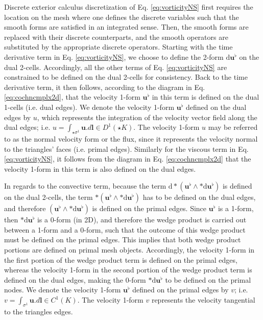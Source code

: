 \documentclass[final,12pt,times]{elsarticle}
\begin{document}
Discrete exterior calculus discretization of Eq. \eqref{eq:vorticityNS} first requires the location on the mesh where one defines the discrete variables such that the smooth forms are satisfied in an integrated sense. Then, the smooth forms are replaced with their discrete counterparts, and the smooth operators are substituted by the appropriate discrete operators. Starting with the time derivative term in Eq. \eqref{eq:vorticityNS}, we choose to define the 2-form $\textrm{d} \mathbf{u}^\flat$ on the dual 2-cells. Accordingly, all the other terms of Eq. \eqref{eq:vorticityNS} are constrained to be defined on the dual 2-cells for consistency. Back to the time derivative term, it then follows, according to the diagram in Eq. \eqref{eq:cochncmplx2d}, that the velocity 1-form $\mathbf{u}^\flat$ in this term is defined on the dual 1-cells (i.e. dual edges). We denote the velocity 1-form $\mathbf{u}^\flat$ defined on the dual edges by $u$, which represents the integration of the velocity vector field along the dual edges; i.e. $u = \int_{\star \sigma^1} \mathbf{u} . d \mathbf{l} \in D^1(\star K)$.  The velocity 1-form $u$ may be referred to as the normal velocity form or the flux, since it represents the velocity normal to the triangles' faces (i.e. primal edges). Similarly for the viscous term in Eq. \eqref{eq:vorticityNS}, it follows from the diagram in Eq. \eqref{eq:cochncmplx2d} that the velocity 1-form in this term is also defined on the dual edges. 

In regards to the convective term, because the term $\textrm{d} \ast(\mathbf{u}^\flat \wedge \ast \textrm{d} \mathbf{u}^\flat)$  is defined on the dual 2-cells, the term $\ast(\mathbf{u}^\flat \wedge \ast \textrm{d} \mathbf{u}^\flat)$ has to be defined on the dual edges, and therefore $(\mathbf{u}^\flat \wedge \ast \textrm{d} \mathbf{u}^\flat)$ is defined on the primal edges. Since $\mathbf{u}^\flat$ is a 1-form, then $\ast \textrm{d} \mathbf{u}^\flat$ is a 0-form (in 2D), and therefore the wedge product is carried out between a 1-form and a 0-form, such that the outcome of this wedge product must be defined on the primal edges. This implies that both wedge product portions are defined on primal mesh objects. Accordingly, the velocity 1-form in the first portion of the wedge product term is defined on the primal edges, whereas the velocity 1-form in the second portion of the wedge product term is defined on the dual edges, making the 0-form $\ast \textrm{d} \mathbf{u}^\flat$ to be defined on the primal nodes. We denote the velocity 1-form $\mathbf{u}^\flat$ defined on the primal edges by $v$; i.e. $v = \int_{\sigma^1} \mathbf{u} . d \mathbf{l} \in C^1(K)$. The velocity 1-form $v$ represents the velocity tangential to the triangles edges. 
\end{document}
